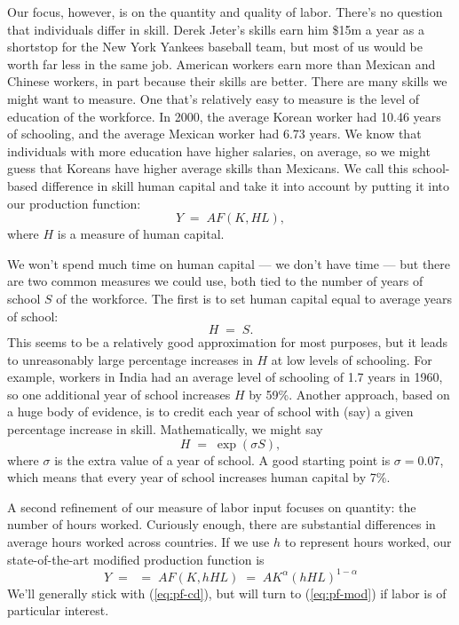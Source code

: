 \documentclass[letterpaper,12pt]{article}
\begin{document}
Our focus, however, is on the quantity and quality of labor.
There's no question that individuals differ in skill.
Derek Jeter's skills earn him
\$15m a year as a shortstop for the New York Yankees baseball team,
but most of us would be worth far less in the same job.
American workers earn more than Mexican and Chinese workers,
in part because their skills are better.
There are many skills we might want to measure.
One that's relatively easy to measure is the level of education of the
workforce.
In 2000, the average Korean worker had 10.46 years of
schooling, and the average Mexican worker had 6.73 years. We know
that individuals with more education have higher salaries, on
average, so we might guess that Koreans have higher average skills
than Mexicans. We call this school-based difference in skill
human capital and take it into account by putting
it into our production function:
\[
    Y \;=\; A F(K,HL),
\]
where $H$ is a measure of human capital.

We won't spend much time on human capital --- we don't have time ---
but there are two common measures we could use,
both tied to the number of years of school $S$ of the workforce.
The first is to set human capital equal to average years of school:
\[
    H \;=\; S .
\]
This seems to be a relatively good approximation for most purposes,
but it leads to unreasonably large percentage increases in $H$
at low levels of schooling.
For example, workers in India had an average level of schooling
of 1.7 years in 1960,
so one additional year of school increases $H$ by 59\%.
Another approach, based on a huge body of evidence,
is to credit each year of school with (say) a given percentage
increase in skill.
Mathematically, we might say
\[
    H \;=\; \exp( \sigma S ) ,
\]
where $\sigma$ is the extra value of a year of school.
A good starting point is $\sigma = 0.07$,
which means that every year of school increases
human capital by 7\%.


A second refinement of our measure of labor input focuses on quantity:
the number of hours worked.
Curiously enough, there are substantial differences
in average hours worked across countries.
If we use $h$ to represent hours worked, our state-of-the-art
modified production function is
\begin{equation}
    Y \;=\; \;=\; A F(K,hHL)
      \;=\;  A K^{\alpha} (hHL)^{1-\alpha}
      \label{eq:pf-mod}
\end{equation}
We'll generally stick with (\ref{eq:pf-cd}),
but will turn to (\ref{eq:pf-mod}) if labor is of
particular interest.
\end{document}
